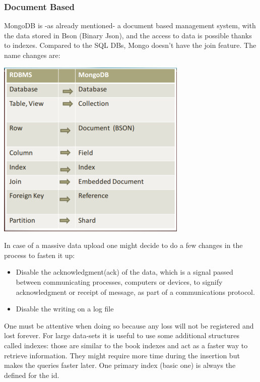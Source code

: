 \documentclass[a4page, 11pt]{article}
\begin{document}
\subsubsection{Document Based\cite{MongoDB}}
MongoDB is -as already mentioned- a document based management system, with the data stored in Bson (Binary Json), and the access to data is possible thanks to indexes. Compared to the SQL DBs, Mongo doesn't have the join feature. The name changes are:

\begin{center}
	\includegraphics[scale=0.6]{IMAGE2.jpg}
\end{center}
In case of a massive data upload one might decide to do a few changes in the process to fasten  it up:

\begin{itemize}[noitemsep]
	 
	\item
	Disable the acknowledgment(ack) of the data, which is a signal passed between communicating processes, computers or devices, to signify acknowledgment or receipt of message, as part of a communications
	protocol.
	\item
	Disable the writing on a log file
\end{itemize}
One must be attentive when doing so because any loss will not be registered and lost forever.
\newline
For large data-sets it is useful to use some additional structures called indexes: those are similar to the book indexes and act as a faster way to retrieve information.
They might require more time during the insertion but makes the queries faster later. 
One primary index (basic one) is always the defined for the id. 
\end{document}

